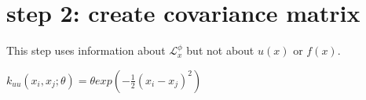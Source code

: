 \documentclass[letterpaper,10pt,english]{sphinxmanual}
\begin{document}
%
\begin{sphinxVerbatim}[commandchars=\\\{\}]
\end{sphinxVerbatim}

\noindent{}

%
\begin{sphinxVerbatim}[commandchars=\\\{\}]
  
    
\end{sphinxVerbatim}

\noindent{}


\section{step 2: create covariance matrix}
\label{\detokenize{notebooks/par_est/par_est:step-2-create-covariance-matrix}}
This step uses information about \(\mathcal{L}_x^\phi\) but not
about \(u(x)\) or \(f(x)\).

\(k_{uu}(x_i, x_j; \theta) = \theta exp(-\frac{1}{2}(x_i-x_j)^2)\)
\end{document}
